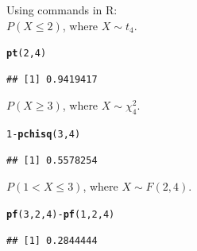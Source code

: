 \documentclass[t,xcolor=pdftex,dvipsnames,table]{beamer}
\makeatletter
\newcommand{\hlnum}[1]{\textcolor[rgb]{0.686,0.059,0.569}{#1}}%
\newcommand{\hlopt}[1]{\textcolor[rgb]{0,0,0}{#1}}%
\newcommand{\hlstd}[1]{\textcolor[rgb]{0.345,0.345,0.345}{#1}}%
\newcommand{\hlkwd}[1]{\textcolor[rgb]{0.737,0.353,0.396}{\textbf{#1}}}%
\newenvironment{kframe}{%
 \def\at@end@of@kframe{}%
 \ifinner\ifhmode%
  \def\at@end@of@kframe{\end{minipage}}%
  \begin{minipage}{\columnwidth}%
 \fi\fi%
 \def\FrameCommand##1{\hskip\@totalleftmargin \hskip-\fboxsep
 \colorbox{shadecolor}{##1}\hskip-\fboxsep
     \hskip-\linewidth \hskip-\@totalleftmargin \hskip\columnwidth}%
 \MakeFramed {\advance\hsize-\width
   \@totalleftmargin\z@ \linewidth\hsize
   \@setminipage}}%
 {\par\unskip\endMakeFramed%
 \at@end@of@kframe}
\newenvironment{knitrout}{}{} %
\makeatother
\begin{document}
\begin{frame}[fragile]\frametitle{}
 
Using commands in R: \\

$P(X \leq 2)$, where $X \sim t_{4}$.

\begin{knitrout}
\color{fgcolor}\begin{kframe}
\begin{alltt}
\hlkwd{pt}\hlstd{(}\hlnum{2}\hlstd{,}\hlnum{4}\hlstd{)}
\end{alltt}
\begin{verbatim}
## [1] 0.9419417
\end{verbatim}
\end{kframe}
\end{knitrout}

$P(X \geq 3)$, where $X \sim \chi^2_{4}$.

\begin{knitrout}
\color{fgcolor}\begin{kframe}
\begin{alltt}
\hlnum{1}\hlopt{-}\hlkwd{pchisq}\hlstd{(}\hlnum{3}\hlstd{,}\hlnum{4}\hlstd{)}
\end{alltt}
\begin{verbatim}
## [1] 0.5578254
\end{verbatim}
\end{kframe}
\end{knitrout}

$P(1 < X \leq 3)$, where $X \sim F(2,4)$.

\begin{knitrout}
\color{fgcolor}\begin{kframe}
\begin{alltt}
\hlkwd{pf}\hlstd{(}\hlnum{3}\hlstd{,}\hlnum{2}\hlstd{,}\hlnum{4}\hlstd{)}\hlopt{-}\hlkwd{pf}\hlstd{(}\hlnum{1}\hlstd{,}\hlnum{2}\hlstd{,}\hlnum{4}\hlstd{)}
\end{alltt}
\begin{verbatim}
## [1] 0.2844444
\end{verbatim}
\end{kframe}
\end{knitrout}

\end{frame}
\end{document}
